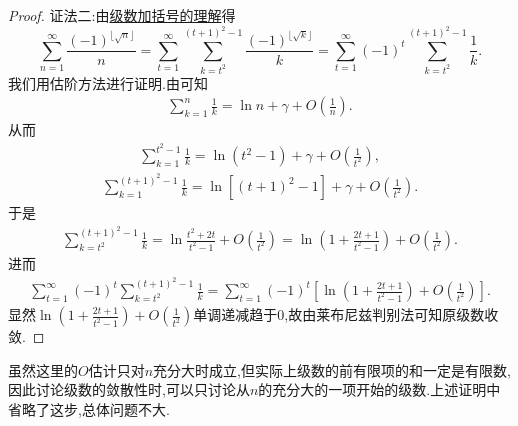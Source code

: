 \documentclass[../../main.tex]{subfiles}
\begin{document}
\begin{proof}
{\color{blue}证法二:}由\hyperref[theorem:级数加括号的理解]{级数加括号的理解}得
\[
\sum_{n=1}^{\infty}{\frac{(-1)^{\lfloor \sqrt{n} \rfloor}}{n}}=\sum_{t=1}^{\infty}{\sum_{k=t^2}^{(t+1)^2-1}{\frac{\left( -1 \right) ^{\lfloor \sqrt{k} \rfloor}}{k}}}=\sum_{t=1}^{\infty}{\left( -1 \right) ^t\sum_{k=t^2}^{(t+1)^2-1}{\frac{1}{k}}}.
\]
我们用估阶方法进行证明.由可知
\begin{align*}
\sum_{k=1}^n{\frac{1}{k}}=\ln n+\gamma +O\left( \frac{1}{n} \right) .
\end{align*}
从而
\begin{align*}
\sum_{k=1}^{t^2-1}{\frac{1}{k}}=\ln \left( t^2-1 \right) +\gamma +O\left( \frac{1}{t^2} \right) ,
\end{align*}
\begin{align*}
\sum_{k=1}^{\left( t+1 \right) ^2-1}{\frac{1}{k}}=\ln \left[ \left( t+1 \right) ^2-1 \right] +\gamma +O\left( \frac{1}{t^2} \right) .
\end{align*}
于是
\begin{align*}
\sum_{k=t^2}^{\left( t+1 \right) ^2-1}{\frac{1}{k}}=\ln \frac{t^2+2t}{t^2-1}+O\left( \frac{1}{t^2} \right) =\ln \left( 1+\frac{2t+1}{t^2-1} \right) +O\left( \frac{1}{t^2} \right) .
\end{align*}
进而
\begin{align*}
\sum_{t=1}^{\infty}{\left( -1 \right) ^t\sum_{k=t^2}^{(t+1)^2-1}{\frac{1}{k}}}=\sum_{t=1}^{\infty}{\left( -1 \right) ^t\left[ \ln \left( 1+\frac{2t+1}{t^2-1} \right) +O\left( \frac{1}{t^2} \right) \right]}.
\end{align*}
显然$\ln \left( 1+\frac{2t+1}{t^2-1} \right) +O\left( \frac{1}{t^2} \right)$单调递减趋于$0$,故由莱布尼兹判别法可知原级数收敛.
\end{proof}
\begin{remark}
虽然这里的$O$估计只对$n$充分大时成立,但实际上级数的前有限项的和一定是有限数,因此讨论级数的敛散性时,可以只讨论从$n$的充分大的一项开始的级数.上述证明中省略了这步,总体问题不大.
\end{remark}
\end{document}
